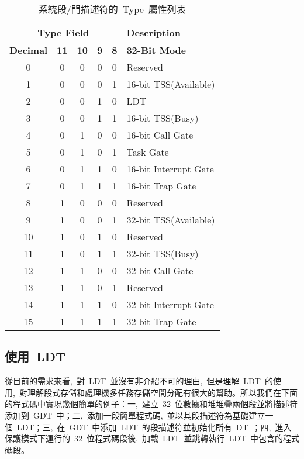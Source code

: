 \begin{itemize}
\begin{center}\begin{longtable}{c|c|c|c|c|l}
\caption[]{系統段/門描述符的~Type~屬性列表}\label{sys_gate_types}\\
\hline
\multicolumn{5}{c|}{\textbf{Type Field}} & \textbf{Description}\bigstrut\\
\hline
\textbf{Decimal} & \textbf{11} & \textbf{10} & \textbf{9} & \textbf{8} & \textbf{32-Bit Mode}\\
\hline
0 & 0 & 0 & 0 & 0 & Reserved\\
1 & 0 & 0 & 0 & 1 & 16-bit TSS(Available)\\
2 & 0 & 0 & 1 & 0 & LDT\\
3 & 0 & 0 & 1 & 1 & 16-bit TSS(Busy)\\
4 & 0 & 1 & 0 & 0 & 16-bit Call Gate\\
5 & 0 & 1 & 0 & 1 & Task Gate\\
6 & 0 & 1 & 1 & 0 & 16-bit Interrupt Gate\\
7 & 0 & 1 & 1 & 1 & 16-bit Trap Gate\\
8 & 1 & 0 & 0 & 0 & Reserved\\
9 & 1 & 0 & 0 & 1 & 32-bit TSS(Available)\\
10 & 1 & 0 & 1 & 0 & Reserved\\
11 & 1 & 0 & 1 & 1 & 32-bit TSS(Busy)\\
12 & 1 & 1 & 0 & 0 & 32-bit Call Gate\\
13 & 1 & 1 & 0 & 1 & Reserved\\
14 & 1 & 1 & 1 & 0 & 32-bit Interrupt Gate\\
15 & 1 & 1 & 1 & 1 & 32-bit Trap Gate\\
\hline
\end{longtable}\end{center}

\end{itemize}

\subsection{使用~LDT~}

從目前的需求來看,~對~LDT~並沒有非介紹不可的理由,~但是理解~LDT~的使用,~對理解段式存儲和處理機多任務存儲空間分配有很大的幫助。所以我們在下面的程式碼中實現幾個簡單的例子：一,~建立~32~位數據和堆堆疊兩個段並將描述符添加到~GDT~中；二,~添加一段簡單程式碼,~並以其段描述符為基礎建立一個~LDT；三,~在~GDT~中添加~LDT~的段描述符並初始化所有~DT~；四,~進入保護模式下運行的~32~位程式碼段後,~加載~LDT~並跳轉執行~LDT~中包含的程式碼段。


